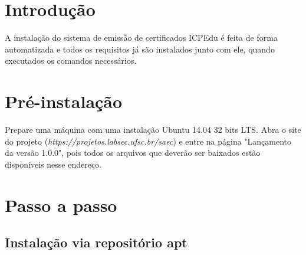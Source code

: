 \section{Introdução}

A instalação do sistema de emissão de certificados ICPEdu é feita de forma automatizada e todos os requisitos já são instalados junto com ele, quando executados os comandos necessários.

\section{Pré-instalação}

Prepare uma máquina com uma instalação Ubuntu 14.04 32 bits LTS. Abra o site do projeto (\textit{https://projetos.labsec.ufsc.br/saec}) e entre na página "Lançamento da versão 1.0.0", pois todos os arquivos que deverão ser baixados estão disponíveis nesse endereço.

\section{Passo a passo}

\subsection{Instalação via repositório apt}

